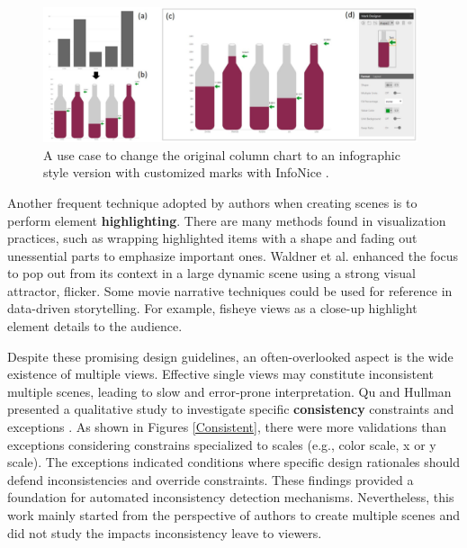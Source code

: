 \begin{figure}[htb]
	\centering 
	\includegraphics[width=0.98\textwidth]{figure/InfoNice.png} 
	\caption{A use case to change the original column chart to an infographic style version with customized marks with InfoNice \cite{Wang2018}. } 
	\label{InfoNice} 
\end{figure}


Another frequent technique adopted by authors when creating scenes is to perform element \textbf{highlighting}.  There are many methods found in visualization practices, such as wrapping highlighted items with a shape and fading out unessential parts to emphasize important ones. 
Waldner et al. \cite{Waldner2014} enhanced the focus to pop out from its context in a large dynamic scene using a strong visual attractor, flicker. Some movie narrative techniques could be used for reference in data-driven storytelling. For example, fisheye views \cite{Furnas1986} as a close-up highlight element details to the audience. 

Despite these promising design guidelines, an often-overlooked aspect is the wide existence of multiple views. Effective single views may constitute inconsistent multiple scenes, leading to slow and error-prone interpretation. Qu and Hullman presented a qualitative study to investigate specific \textbf{consistency} constraints and exceptions \cite{Qu2018, Qu2016}. As shown in Figures \ref{Consistent}, there were more validations than exceptions considering constrains specialized to scales (e.g., color scale, x or y scale).  The exceptions indicated conditions where specific design rationales should defend inconsistencies and override constraints. These findings provided a foundation for automated inconsistency detection mechanisms. Nevertheless, this work mainly started   from the perspective of authors to create multiple scenes and did not study the impacts inconsistency leave to viewers. 

